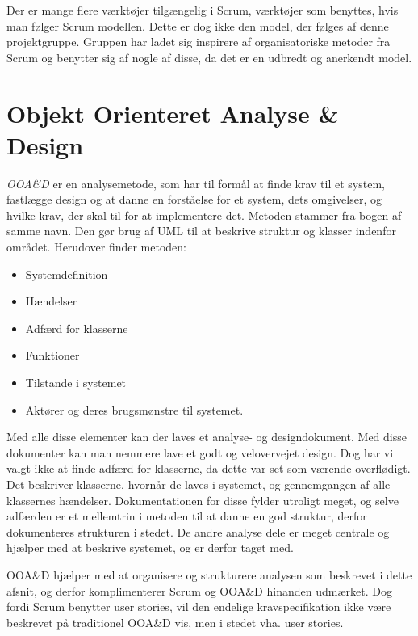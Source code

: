 Der er mange flere værktøjer tilgængelig i Scrum, værktøjer som benyttes, hvis man følger Scrum modellen.
Dette er dog ikke den model, der følges af denne projektgruppe.
Gruppen har ladet sig inspirere af organisatoriske metoder fra Scrum og benytter sig af nogle af disse, da det er en udbredt og anerkendt model.
\newpage
\section{Objekt Orienteret Analyse \& Design}
\textit{OOA\&D} er en analysemetode, som har til formål at finde krav til et system, fastlægge design og at danne en forståelse for et system, dets omgivelser, og hvilke krav, der skal til for at implementere det.
Metoden stammer fra bogen af samme navn.\citep{OOA&D2001}
Den gør brug af UML til at beskrive struktur og klasser indenfor området.
Herudover finder metoden:

\begin{itemize}[nolistsep,noitemsep]
\item Systemdefinition
\item Hændelser
\item Adfærd for klasserne
\item Funktioner
\item Tilstande i systemet
\item Aktører og deres brugsmønstre til systemet.
\end{itemize}

Med alle disse elementer kan der laves et analyse- og designdokument.
Med disse dokumenter kan man nemmere lave et godt og velovervejet design.
Dog har vi valgt ikke at finde adfærd for klasserne, da dette var set som værende overflødigt.
Det beskriver klasserne, hvornår de laves i systemet, og gennemgangen af alle klassernes hændelser. 
Dokumentationen for disse fylder utroligt meget, og selve adfærden er et mellemtrin i metoden til at danne en god struktur, derfor dokumenteres strukturen i stedet.
De andre analyse dele er meget centrale og hjælper med at beskrive systemet, og er derfor taget med. 

OOA\&D hjælper med at organisere og strukturere analysen som beskrevet i dette afsnit, og derfor komplimenterer Scrum og OOA\&D hinanden udmærket.
Dog fordi Scrum benytter user stories, vil den endelige kravspecifikation ikke være beskrevet på traditionel OOA\&D vis, men i stedet vha. user stories.










